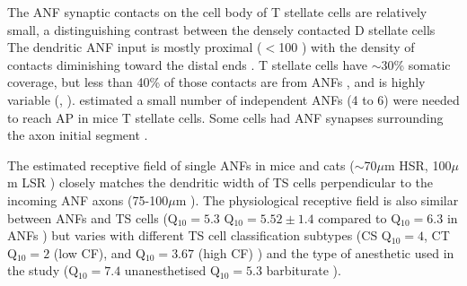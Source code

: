  The ANF synaptic contacts on the cell body of T stellate cells are relatively small,
 a distinguishing contrast between the densely contacted D stellate cells
 \citep{Cant:1981,Cant:1982,RyugoWrightEtAl:1993,TolbertMorest:1982a,FayPopper:1994,ReddCahillEtAl:2002,RyugoWrigthEtAl:1993,Ryugo:1992,RyugoParks:2003}
 The dendritic ANF input is mostly proximal ($<$100 \um) with the density of contacts
 diminishing toward the distal ends \citep{SmithRhode:1989}.  T stellate cells have
 $\sim$30\% somatic coverage, but less than 40\% of those contacts are from ANFs
 \citep{Cant:1981,Cant:1982,RyugoWrightEtAl:1993,TolbertMorest:1982a,SmithRhode:1989},
 and is highly variable (\citep*[36$\pm$10.5\% of somatic terminals in
 cat][]{SmithRhode:1989}, \citep*[0--6 terminals per soma in
 chinchilla][]{JosephsonMorest:1998}).  \citet{FerragamoGoldingEtAl:1998a} estimated
 a small number of independent ANFs (4 to 6) were needed to reach AP in mice T
 stellate cells.  Some cells had ANF synapses surrounding the axon initial segment
 \citep{JosephsonMorest:1998}.


  




 The estimated receptive field of single ANFs in mice and cats ($\sim$70$\mu$m HSR,
 100$\mu$m LSR
 \citep{OertelWuEtAl:1990,Ryugo:2008,MeltzerRyugo:2006,RyugoParks:2003,Ryugo:1992,BrownBerglundEtAl:1988,RoullierCronin-SchreiberEtAl:1986,FeketeRouillerEtAl:1984})
 closely matches the dendritic width of TS cells perpendicular to the incoming ANF
 axons (75-100$\mu$m \citep[Mouse]{OertelWuEtAl:1990}).
 The physiological receptive field is also similar between ANFs and TS cells
 (Q$_{10}=5.3$ \citep[cat][]{RhodeSmith:1986}Q$_{10}=5.52\pm1.4$ compared to
 Q$_{10}=6.3$ in ANFs \citep[guinea pig]{JiangPalmerEtAl:1996}) but varies with
 different TS cell classification subtypes (CS Q$_{10}=4$, CT Q$_{10}=2$ (low CF),
 and Q$_{10}=3.67$ (high CF) \citep[guinea pig]{PalmerWallaceEtAl:2003}) and the type
 of anesthetic used in the study (Q$_{10}=7.4$ unanesthetised Q$_{10}=5.3$
 barbiturate \citep[cat][]{RhodeKettner:1987}).

